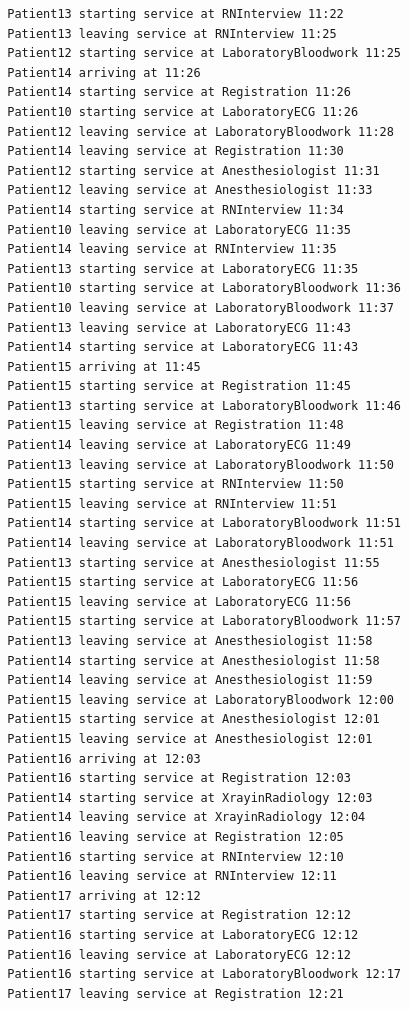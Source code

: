 \documentclass[12pt]{article}
\begin{document}
\begin{verbatim}
		Patient13 starting service at RNInterview 11:22
		Patient13 leaving service at RNInterview 11:25
		Patient12 starting service at LaboratoryBloodwork 11:25
		Patient14 arriving at 11:26
		Patient14 starting service at Registration 11:26
		Patient10 starting service at LaboratoryECG 11:26
		Patient12 leaving service at LaboratoryBloodwork 11:28
		Patient14 leaving service at Registration 11:30
		Patient12 starting service at Anesthesiologist 11:31
		Patient12 leaving service at Anesthesiologist 11:33
		Patient14 starting service at RNInterview 11:34
		Patient10 leaving service at LaboratoryECG 11:35
		Patient14 leaving service at RNInterview 11:35
		Patient13 starting service at LaboratoryECG 11:35
		Patient10 starting service at LaboratoryBloodwork 11:36
		Patient10 leaving service at LaboratoryBloodwork 11:37
		Patient13 leaving service at LaboratoryECG 11:43
		Patient14 starting service at LaboratoryECG 11:43
		Patient15 arriving at 11:45
		Patient15 starting service at Registration 11:45
		Patient13 starting service at LaboratoryBloodwork 11:46
		Patient15 leaving service at Registration 11:48
		Patient14 leaving service at LaboratoryECG 11:49
		Patient13 leaving service at LaboratoryBloodwork 11:50
		Patient15 starting service at RNInterview 11:50
		Patient15 leaving service at RNInterview 11:51
		Patient14 starting service at LaboratoryBloodwork 11:51
		Patient14 leaving service at LaboratoryBloodwork 11:51
		Patient13 starting service at Anesthesiologist 11:55
		Patient15 starting service at LaboratoryECG 11:56
		Patient15 leaving service at LaboratoryECG 11:56
		Patient15 starting service at LaboratoryBloodwork 11:57
		Patient13 leaving service at Anesthesiologist 11:58
		Patient14 starting service at Anesthesiologist 11:58
		Patient14 leaving service at Anesthesiologist 11:59
		Patient15 leaving service at LaboratoryBloodwork 12:00
		Patient15 starting service at Anesthesiologist 12:01
		Patient15 leaving service at Anesthesiologist 12:01
		Patient16 arriving at 12:03
		Patient16 starting service at Registration 12:03
		Patient14 starting service at XrayinRadiology 12:03
		Patient14 leaving service at XrayinRadiology 12:04
		Patient16 leaving service at Registration 12:05
		Patient16 starting service at RNInterview 12:10
		Patient16 leaving service at RNInterview 12:11
		Patient17 arriving at 12:12
		Patient17 starting service at Registration 12:12
		Patient16 starting service at LaboratoryECG 12:12
		Patient16 leaving service at LaboratoryECG 12:12
		Patient16 starting service at LaboratoryBloodwork 12:17
		Patient17 leaving service at Registration 12:21

\end{verbatim}
\end{document}
